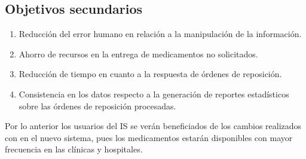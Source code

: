 \subsection{Objetivos secundarios}
\begin{enumerate}
\item Reducción del error humano en relación a la manipulación de la información.
\item Ahorro de recursos en la entrega de medicamentos no solicitados.
\item Reducción de tiempo en cuanto a la respuesta de órdenes de reposición.
\item Consistencia en los datos respecto a la generación de reportes estadísticos sobre las órdenes de reposición procesadas.
\end{enumerate}
Por lo anterior los usuarios del IS se verán beneficiados de los cambios realizados con en el nuevo sistema, pues los medicamentos estarán disponibles con mayor frecuencia en las clínicas y hospitales.

